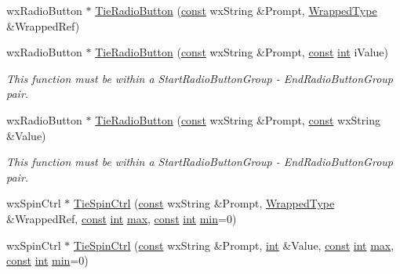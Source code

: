 \begin{DoxyCompactItemize}
\item 
wx\+Radio\+Button $\ast$ \hyperlink{class_shuttle_gui_base_a2db7b2d2d416192a80d4661fc396c310}{Tie\+Radio\+Button} (\hyperlink{getopt1_8c_a2c212835823e3c54a8ab6d95c652660e}{const} wx\+String \&Prompt, \hyperlink{class_wrapped_type}{Wrapped\+Type} \&Wrapped\+Ref)
\item 
wx\+Radio\+Button $\ast$ \hyperlink{class_shuttle_gui_base_a85e3d0f4327b7518f2d9a7f54832b55a}{Tie\+Radio\+Button} (\hyperlink{getopt1_8c_a2c212835823e3c54a8ab6d95c652660e}{const} wx\+String \&Prompt, \hyperlink{getopt1_8c_a2c212835823e3c54a8ab6d95c652660e}{const} \hyperlink{xmltok_8h_a5a0d4a5641ce434f1d23533f2b2e6653}{int} i\+Value)
\begin{DoxyCompactList}\small\item\em This function must be within a Start\+Radio\+Button\+Group -\/ End\+Radio\+Button\+Group pair. \end{DoxyCompactList}\item 
wx\+Radio\+Button $\ast$ \hyperlink{class_shuttle_gui_base_a4996f2813af5ddbe94d8e9d0787f5076}{Tie\+Radio\+Button} (\hyperlink{getopt1_8c_a2c212835823e3c54a8ab6d95c652660e}{const} wx\+String \&Prompt, \hyperlink{getopt1_8c_a2c212835823e3c54a8ab6d95c652660e}{const} wx\+String \&Value)
\begin{DoxyCompactList}\small\item\em This function must be within a Start\+Radio\+Button\+Group -\/ End\+Radio\+Button\+Group pair. \end{DoxyCompactList}\item 
wx\+Spin\+Ctrl $\ast$ \hyperlink{class_shuttle_gui_base_ac50604c6322198d8e6cd08191109a379}{Tie\+Spin\+Ctrl} (\hyperlink{getopt1_8c_a2c212835823e3c54a8ab6d95c652660e}{const} wx\+String \&Prompt, \hyperlink{class_wrapped_type}{Wrapped\+Type} \&Wrapped\+Ref, \hyperlink{getopt1_8c_a2c212835823e3c54a8ab6d95c652660e}{const} \hyperlink{xmltok_8h_a5a0d4a5641ce434f1d23533f2b2e6653}{int} \hyperlink{_t_d_stretch_8cpp_ac39d9cef6a5e030ba8d9e11121054268}{max}, \hyperlink{getopt1_8c_a2c212835823e3c54a8ab6d95c652660e}{const} \hyperlink{xmltok_8h_a5a0d4a5641ce434f1d23533f2b2e6653}{int} \hyperlink{_compare_audio_command_8cpp_abd8bbcfabb3ddef2ccaafb9928a37b95}{min}=0)
\item 
wx\+Spin\+Ctrl $\ast$ \hyperlink{class_shuttle_gui_base_a84a575e10eb0c60c8fd56c223fbe1906}{Tie\+Spin\+Ctrl} (\hyperlink{getopt1_8c_a2c212835823e3c54a8ab6d95c652660e}{const} wx\+String \&Prompt, \hyperlink{xmltok_8h_a5a0d4a5641ce434f1d23533f2b2e6653}{int} \&Value, \hyperlink{getopt1_8c_a2c212835823e3c54a8ab6d95c652660e}{const} \hyperlink{xmltok_8h_a5a0d4a5641ce434f1d23533f2b2e6653}{int} \hyperlink{_t_d_stretch_8cpp_ac39d9cef6a5e030ba8d9e11121054268}{max}, \hyperlink{getopt1_8c_a2c212835823e3c54a8ab6d95c652660e}{const} \hyperlink{xmltok_8h_a5a0d4a5641ce434f1d23533f2b2e6653}{int} \hyperlink{_compare_audio_command_8cpp_abd8bbcfabb3ddef2ccaafb9928a37b95}{min}=0)

\end{DoxyCompactItemize}
